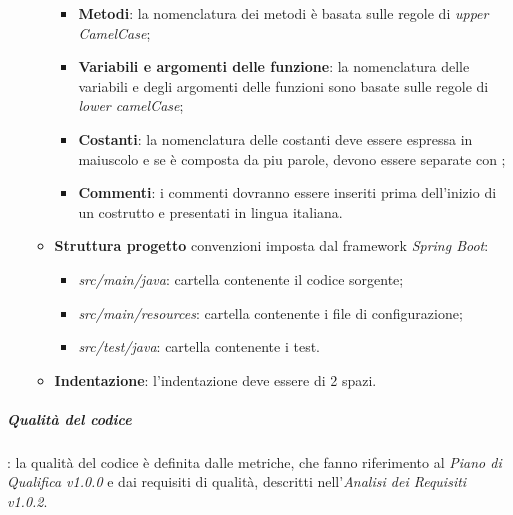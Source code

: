 \begin{itemize}
\begin{itemize}
\begin{itemize}
            \item \textbf{Metodi}: la nomenclatura dei metodi è basata sulle regole di \textit{upper CamelCase};
            \item \textbf{Variabili e argomenti delle funzione}: la nomenclatura delle variabili e degli argomenti delle funzioni sono basate sulle regole di \textit{lower camelCase};
            \item \textbf{Costanti}: la nomenclatura delle costanti deve essere espressa in maiuscolo e se è composta da piu parole, devono essere separate con \textit{\textunderscore};
            \item \textbf{Commenti}: i commenti dovranno essere inseriti prima dell’inizio di un  costrutto e presentati in lingua italiana.
        \end{itemize}
        \item \textbf{Struttura progetto} convenzioni imposta dal framework \textit{Spring Boot}:
        \begin{itemize}
            \item \textit{src/main/java}: cartella contenente il codice sorgente;
            \item \textit{src/main/resources}: cartella contenente i file di configurazione;
            \item \textit{src/test/java}: cartella contenente i test.
        \end{itemize}
        \item \textbf{Indentazione}: l'indentazione deve essere di 2 spazi.
    \end{itemize}
\end{itemize}

\subparagraph{Qualità del codice}: la qualità del codice è definita dalle metriche, che fanno riferimento al \textit{Piano di Qualifica v1.0.0} e dai requisiti di qualità, descritti nell'\textit{Analisi dei Requisiti v1.0.2}. 

